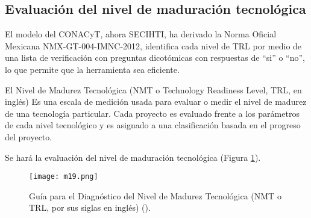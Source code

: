 \subsection{Evaluación del nivel de maduración tecnológica}

El modelo del CONACyT, ahora SECIHTI, ha derivado la Norma Oficial Mexicana NMX-GT-004-IMNC-2012, identifica cada nivel de TRL por medio de una lista de verificación con preguntas dicotómicas con respuestas de ``si'' o ``no'', lo que permite que la herramienta sea eficiente.


El Nivel de Madurez Tecnológica (NMT o Technology Readiness Level, TRL, en inglés) 
Es una escala de medición usada para evaluar o medir el nivel de madurez de una
tecnología particular. Cada proyecto es evaluado frente a los parámetros de cada
nivel tecnológico y es asignado a una clasificación basada en el progreso del
proyecto.

Se hará la evaluación del nivel de maduración tecnológica (Figura \ref{m19}).

\begin{figure}[h!]
\centering
  \texttt{[image: m19.png]}
  \caption{Guía para el Diagnóstico del Nivel de Madurez Tecnológica (NMT o TRL, por sus siglas en inglés) (\cite{SECIHTIConvocatorias}).}
  \label{m19}
\end{figure}
